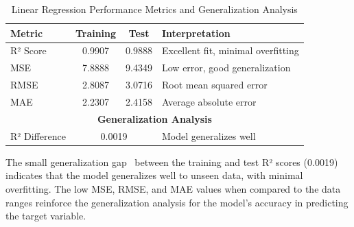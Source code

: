 
\begin{table}[htbp]
    \centering
    \begin{tabular}{ || l || c || c || l || }
        \hline
        \textbf{Metric} & \textbf{Training} & \textbf{Test} & \textbf{Interpretation} \\
        \hline\hline
        R² Score & 0.9907 & 0.9888 & Excellent fit, minimal overfitting \\
        \hline
        MSE & 7.8888 & 9.4349 & Low error, good generalization \\
        \hline
        RMSE & 2.8087 & 3.0716 & Root mean squared error \\
        \hline
        MAE & 2.2307 & 2.4158 & Average absolute error \\
        \hline\hline
        \multicolumn{4}{||c||}{\textbf{Generalization Analysis}} \\
        \hline\hline
        R² Difference & \multicolumn{2}{c||}{0.0019} & Model generalizes well \\
        \hline
    \end{tabular}
    \caption{Linear Regression Performance Metrics and Generalization Analysis}\label{tab:linear_regression_results}
\end{table}

The small generalization gap~\cite{wiki_generalization_error} between the training and test R² scores (0.0019) indicates that the model generalizes well to unseen data, with minimal overfitting.
The low MSE, RMSE, and MAE values when compared to the data ranges reinforce the generalization analysis for the model's accuracy in predicting the target variable.